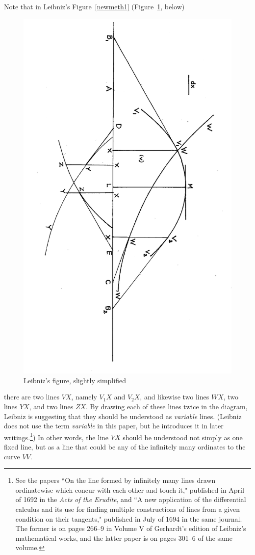 \documentclass[polutonikogreek,english,twoside,openright]{article}
\begin{document}
Note that in Leibniz's Figure~\ref{newmeth1} (Figure~\ref{newmeth1A}, below)
\begin{figure}[htp]
\begin{center}
\includegraphics[width=.85\textwidth]{fig/Figure2A}
\caption{Leibniz's figure, slightly simplified}
\label{newmeth1A}
\end{center}
\end{figure}
 there are two lines $VX$, namely $V_1X$ and $V_2X$, and likewise two lines $WX$, two lines $YX$, and two lines $ZX$.  By drawing each of these lines twice in the diagram, Leibniz is suggesting that they should be understood as {\em variable} lines. (Leibniz does not use the term {\em variable} in this paper, but he introduces it in later writings.\footnote{See the papers ``On the line formed by infinitely many lines drawn ordinatewise which concur with each other and touch it," published in April of 1692 in the {\em Acts of the Erudite}, and ``A new application of the differential calculus and its use for finding multiple constructions of lines from a given condition on their tangents," published in July of 1694 in the same journal.  The former is on pages 266--9 in Volume V of Gerhardt's edition of Leibniz's mathematical works, and the latter paper is on pages 301--6 of the same volume.})  In other words, the line $VX$ should be understood not simply as one fixed line, but as a line that could be any of the infinitely many ordinates to the curve $VV$.
\end{document}
